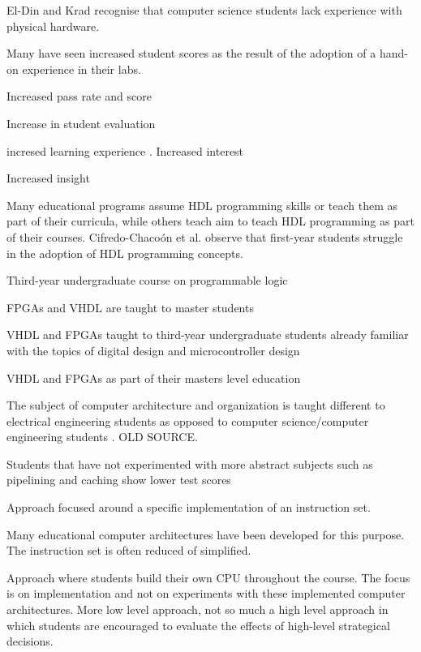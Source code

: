 \documentclass[openright]{uva-bachelor-thesis}
\begin{document}
El-Din and Krad \cite{el2011teaching} recognise that computer science students lack experience with physical hardware. 

Many have seen increased student scores as the result of the adoption of a hand-on experience in their labs.

Increased pass rate and score \cite{paharsingh2009novel}

Increase in student evaluation \cite{paharsingh2009novel}

incresed learning experience \cite{oztekin2011bzk}. Increased interest \cite{cifredo2015computer}

Increased insight \cite{bulic2013fpga, cifredo2015computer}


Many educational programs assume HDL programming skills \cite{jansen2014every} or teach them as part of their curricula, while others teach aim to teach HDL programming as part of their courses.  Cifredo-Chaco\'on et al.  \cite{cifredo2015computer} observe that first-year students struggle in the adoption of HDL programming concepts. 

Third-year undergraduate course on programmable logic \cite{kellett2012project}

FPGAs and VHDL are taught to master students \cite{pereira2012basic}

VHDL and FPGAs taught to third-year undergraduate students already familiar with the topics of digital design and microcontroller design \cite{kellett2012project}

VHDL and FPGAs as part of their masters level education \cite{jansen2014every, pereira2012basic}

The subject of computer architecture and organization is taught different to electrical engineering students as opposed to computer science/computer engineering students \cite{calazans2001integrating}. OLD SOURCE.

Students that have not experimented with more abstract subjects such as pipelining and caching show lower test scores \cite{paharsingh2009novel}

Approach focused around a specific implementation of an instruction set. 

Many educational computer architectures have been developed for this purpose. The instruction set is often reduced of simplified. 

Approach where students build their own CPU throughout the course. The focus is on implementation and not on experiments with these implemented computer architectures. More low level approach, not so much a high level approach in which students are encouraged to evaluate the effects of high-level strategical decisions. 
\end{document}
